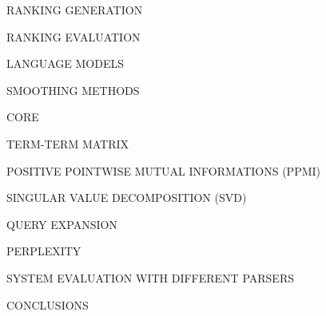 \begin{frame}{RANKING GENERATION}
    
\end{frame}

\begin{frame}{RANKING EVALUATION}
    
\end{frame}

\begin{frame}{LANGUAGE MODELS}
    
\end{frame}

\begin{frame}{SMOOTHING METHODS}
    
\end{frame}

\begin{frame}{CORE}
    
\end{frame}

\begin{frame}{TERM-TERM MATRIX}
    
\end{frame}

\begin{frame}{POSITIVE POINTWISE MUTUAL INFORMATIONS (PPMI)}
    
\end{frame}

\begin{frame}{SINGULAR VALUE DECOMPOSITION (SVD)}
    
\end{frame}

\begin{frame}{QUERY EXPANSION}
    
\end{frame}

\begin{frame}{PERPLEXITY}
    
\end{frame}

\begin{frame}{SYSTEM EVALUATION WITH DIFFERENT PARSERS}
    
\end{frame}

\begin{frame}{CONCLUSIONS}
    
\end{frame}







